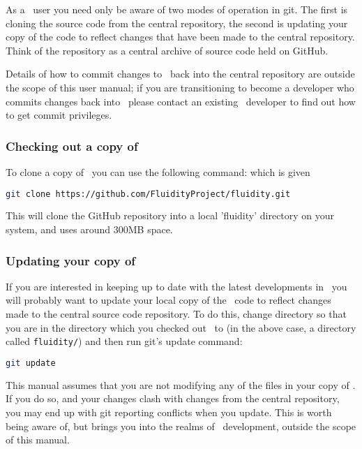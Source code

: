 As a \fluidity\ user you need only be aware of two modes of operation in git.
The first is cloning the source code from the central repository, the second is
updating your copy of the code to reflect changes that have been made to the
central repository. Think of the repository as a central archive of source code
held on GitHub.

Details of how to commit changes to \fluidity\ back into the central repository
are outside the scope of this user manual; if you are transitioning to become a
developer who commits changes back into \fluidity\ please contact an existing
\fluidity\ developer to find out how to get commit privileges.

\subsubsection{Checking out a copy of \fluidity}
\label{sec:git_checkout}

To clone a copy of \fluidity\ you can use the following command: which is given

\begin{lstlisting}[language=Bash]
git clone https://github.com/FluidityProject/fluidity.git
\end{lstlisting}

This will clone the GitHub repository into a local 'fluidity' directory on your
system, and uses around 300MB space.

\subsubsection{Updating your copy of \fluidity}
\label{sec:git_updating}

If you are interested in keeping up to date with the latest developments in
\fluidity\ you will probably want to update your local copy of the \fluidity\
code to reflect changes made to the central source code repository. To do this,
change directory so that you are in the directory which you checked out
\fluidity\ to (in the above case, a directory called
\lstinline[language=Bash]+fluidity/+) and then run git's update command:

\begin{lstlisting}[language=Bash]
git update
\end{lstlisting}

This manual assumes that you are not modifying any of the files in your copy of
\fluidity. If you do so, and your changes clash with changes from the central
repository, you may end up with git reporting conflicts when you update. This
is worth being aware of, but brings you into the realms of \fluidity\
development, outside the scope of this manual.

